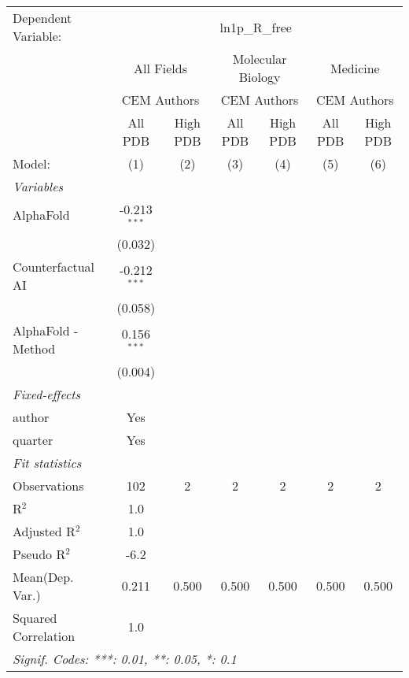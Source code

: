 \begingroup
\centering
\begin{tabular}{lcccccc}
   \tabularnewline \midrule \midrule
   Dependent Variable: & \multicolumn{6}{c}{ln1p\_R\_free}\\
 & \multicolumn{2}{c}{All Fields} & \multicolumn{2}{c}{Molecular Biology} & \multicolumn{2}{c}{Medicine} \\
\cmidrule(lr){2-3} \cmidrule(lr){4-5} \cmidrule(lr){6-7}
 & \multicolumn{2}{c}{CEM Authors} & \multicolumn{2}{c}{CEM Authors} & \multicolumn{2}{c}{CEM Authors} \\
\cmidrule(lr){2-3} \cmidrule(lr){4-5} \cmidrule(lr){6-7}
 & \multicolumn{1}{c}{All PDB} & \multicolumn{1}{c}{High PDB} & \multicolumn{1}{c}{All PDB} & \multicolumn{1}{c}{High PDB} & \multicolumn{1}{c}{All PDB} & \multicolumn{1}{c}{High PDB} \\
\cmidrule(lr){2-2} \cmidrule(lr){3-3} \cmidrule(lr){4-4} \cmidrule(lr){5-5} \cmidrule(lr){6-6} \cmidrule(lr){7-7}
   Model:              & (1)            & (2) & (3) & (4) & (5) & (6)\\  
   \midrule
   \emph{Variables}\\
   AlphaFold           & -0.213$^{***}$ &     &     &     &     &   \\   
                       & (0.032)        &     &     &     &     &   \\   
   Counterfactual AI   & -0.212$^{***}$ &     &     &     &     &   \\   
                       & (0.058)        &     &     &     &     &   \\   
   AlphaFold - Method  & 0.156$^{***}$  &     &     &     &     &   \\   
                       & (0.004)        &     &     &     &     &   \\   
   \midrule
   \emph{Fixed-effects}\\
   author              & Yes            &     &     &     &     & \\  
   quarter             & Yes            &     &     &     &     & \\  
   \midrule
   \emph{Fit statistics}\\
   Observations        & 102            & 2   & 2   & 2   & 2   & 2\\  
   R$^2$               & 1.0            &     &     &     &     & \\  
   Adjusted R$^2$      & 1.0            &     &     &     &     & \\  
   Pseudo R$^2$        & -6.2           &     &     &     &     & \\  
Mean(Dep. Var.) & 0.211 & 0.500 & 0.500 & 0.500 & 0.500 & 0.500 \\
   Squared Correlation & 1.0            &     &     &     &     & \\  
   \midrule \midrule
   \multicolumn{7}{l}{\emph{Signif. Codes: ***: 0.01, **: 0.05, *: 0.1}}\\
\end{tabular}
\par\endgroup
